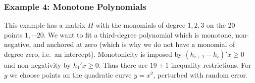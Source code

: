 \documentclass[
  12pt,
  letterpaper,
  DIV=11,
  numbers=noendperiod]{scrreprt}
\newenvironment{Shaded}{\begin{snugshade}}{\end{snugshade}}
\newcommand{\AttributeTok}[1]{\textcolor[rgb]{0.40,0.45,0.13}{#1}}
\newcommand{\ConstantTok}[1]{\textcolor[rgb]{0.56,0.35,0.01}{#1}}
\newcommand{\DecValTok}[1]{\textcolor[rgb]{0.68,0.00,0.00}{#1}}
\newcommand{\FloatTok}[1]{\textcolor[rgb]{0.68,0.00,0.00}{#1}}
\newcommand{\FunctionTok}[1]{\textcolor[rgb]{0.28,0.35,0.67}{#1}}
\newcommand{\NormalTok}[1]{\textcolor[rgb]{0.00,0.23,0.31}{#1}}
\newcommand{\OtherTok}[1]{\textcolor[rgb]{0.00,0.23,0.31}{#1}}
\newcommand{\SpecialCharTok}[1]{\textcolor[rgb]{0.37,0.37,0.37}{#1}}
\newcommand{\StringTok}[1]{\textcolor[rgb]{0.13,0.47,0.30}{#1}}
\theoremstyle{remark}
\begin{document}
\subsubsection{Example 4: Monotone
Polynomials}\label{example-4-monotone-polynomials}

This example has a matrix \(H\) with the monomials of degree \(1,2,3\)
on the 20 points \(1,\cdots 20\). We want to fit a third-degree
polynomial which is monotone, non-negative, and anchored at zero (which
is why we do not have a monomial of degree zero, i.e.~an intercept).
Monotonicity is imposed by \((h_{i+1}-h_{i})'x\geq 0\) and
non-negativity by \(h_1'x\geq 0\). Thus there are \(19+1\) inequality
restrictions. For \(y\) we choose points on the quadratic curve
\(y=x^2\), perturbed with random error.

\begin{Shaded}
\end{Shaded}
\end{document}
